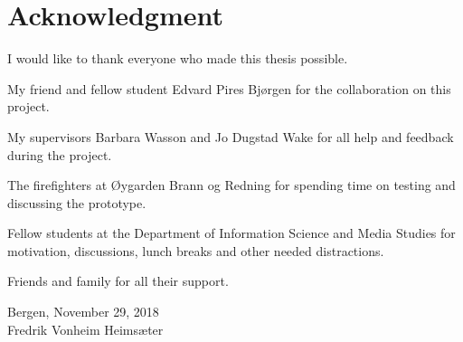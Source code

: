 \documentclass[../Main/thesis.tex]{subfiles}
\begin{document}
\chapter*{Acknowledgment}
I would like to thank everyone who made this thesis possible.

My friend and fellow student Edvard Pires Bjørgen for the collaboration on this project.

My supervisors Barbara Wasson and Jo Dugstad Wake for all help and feedback during the project.

The firefighters at Øygarden Brann og Redning for spending time on testing and discussing the prototype.

Fellow students at the Department of Information Science and Media Studies for motivation, discussions, lunch breaks and other needed distractions.

Friends and family for all their support.

\raggedleft
Bergen, November 29, 2018 \\
Fredrik Vonheim Heimsæter


\blankpage
\end{document}
